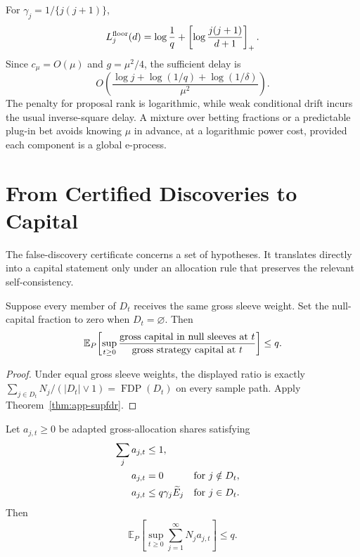 For \(\gamma_j=1/\{j(j+1)\}\),
\[
  L_j^{\rm floor}(d)=\log\frac1q+
  \left[\log\frac{j(j+1)}{d+1}\right]_+.
\]
Since \(c_\mu=O(\mu)\) and \(g=\mu^2/4\), the sufficient delay is
\begin{equation}
 O\!\left(
   \frac{\log j+\log(1/q)+\log(1/\delta)}{\mu^2}
 \right).
 \label{eq:app-delay-order}
\end{equation}
The penalty for proposal rank is logarithmic, while weak conditional drift
incurs the usual inverse-square delay.  A mixture over betting fractions or
a predictable plug-in bet avoids knowing \(\mu\) in advance, at a
logarithmic power cost, provided each component is a global e-process.

\section{From Certified Discoveries to Capital}
\label{app:capital}

The false-discovery certificate concerns a set of hypotheses.  It translates
directly into a capital statement only under an allocation rule that
preserves the relevant self-consistency.

\begin{corollary}
\label{cor:app-equal-weight}
Suppose every member of \(D_t\) receives the same gross sleeve weight.  Set
the null-capital fraction to zero when \(D_t=\varnothing\).  Then
\begin{equation}
 \mathbb E_P\!\left[
   \sup_{t\geq0}
   \frac{\textnormal{gross capital in null sleeves at }t}
        {\textnormal{gross strategy capital at }t}
 \right]\leq q.
 \label{eq:app-equal-capital}
\end{equation}
\end{corollary}

\begin{proof}
Under equal gross sleeve weights, the displayed ratio is exactly
\(\sum_{j\in D_t}N_j/(|D_t|\vee1)=\operatorname{FDP}(D_t)\) on every sample
path.  Apply Theorem~\ref{thm:app-supfdr}.
\end{proof}

\begin{corollary}
\label{cor:app-e-budget}
Let \(a_{j,t}\geq0\) be adapted gross-allocation shares satisfying
\begin{align}
 \sum_ja_{j,t}&\leq1,\notag\\
 a_{j,t}&=0 &&\text{for }j\notin D_t,\notag\\
 a_{j,t}&\leq q\gamma_j\widetilde E_j
       &&\text{for }j\in D_t.
 \label{eq:app-allocation-constraints}
\end{align}
Then
\begin{equation}
  \mathbb E_P\!\left[
    \sup_{t\geq0}\sum_{j=1}^{\infty}N_ja_{j,t}\right]\leq q.
  \label{eq:app-false-exposure}
\end{equation}
\end{corollary}

